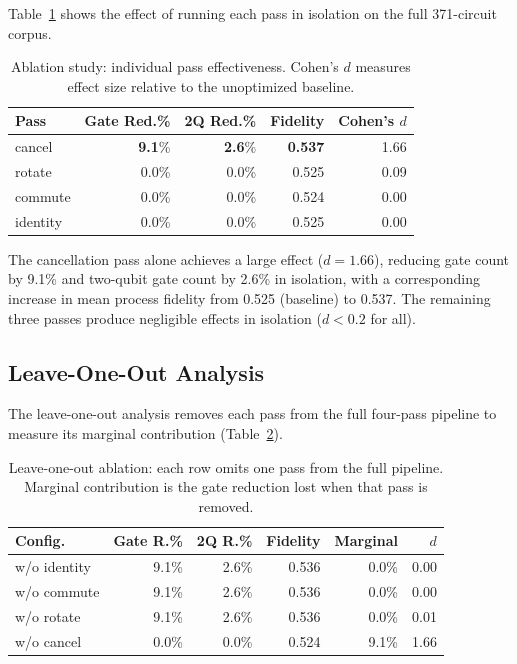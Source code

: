 \documentclass[sigconf,nonacm]{acmart}
\begin{document}
Table~\ref{tab:ablation-ind} shows the effect of running each pass in isolation on the full 371-circuit corpus.

\begin{table}[t]
\centering
\caption{Ablation study: individual pass effectiveness. Cohen's $d$ measures effect size relative to the unoptimized baseline.}
\label{tab:ablation-ind}
\begin{tabular}{lrrrr}
\toprule
\textbf{Pass} & \textbf{Gate Red.\%} & \textbf{2Q Red.\%} & \textbf{Fidelity} & \textbf{Cohen's $d$} \\
\midrule
cancel & \textbf{9.1}\% & \textbf{2.6}\% & \textbf{0.537} & 1.66 \\
rotate & 0.0\% & 0.0\% & 0.525 & 0.09 \\
commute & 0.0\% & 0.0\% & 0.524 & 0.00 \\
identity & 0.0\% & 0.0\% & 0.525 & 0.00 \\
\bottomrule
\end{tabular}
\end{table}

The cancellation pass alone achieves a large effect ($d = 1.66$), reducing gate count by 9.1\% and two-qubit gate count by 2.6\% in isolation, with a corresponding increase in mean process fidelity from 0.525 (baseline) to 0.537. The remaining three passes produce negligible effects in isolation ($d < 0.2$ for all).
\subsection{Leave-One-Out Analysis}

The leave-one-out analysis removes each pass from the full four-pass pipeline to measure its marginal contribution (Table~\ref{tab:ablation-loo}).

\begin{table}[t]
\centering
\caption{Leave-one-out ablation: each row omits one pass from the full pipeline. Marginal contribution is the gate reduction lost when that pass is removed.}
\label{tab:ablation-loo}
\begin{tabular}{lrrrrr}
\toprule
\textbf{Config.} & \textbf{Gate R.\%} & \textbf{2Q R.\%} & \textbf{Fidelity} & \textbf{Marginal} & \textbf{$d$} \\
\midrule
w/o identity & 9.1\% & 2.6\% & 0.536 & 0.0\% & 0.00 \\
w/o commute & 9.1\% & 2.6\% & 0.536 & 0.0\% & 0.00 \\
w/o rotate & 9.1\% & 2.6\% & 0.536 & 0.0\% & 0.01 \\
w/o cancel & 0.0\% & 0.0\% & 0.524 & 9.1\% & 1.66 \\
\bottomrule
\end{tabular}
\end{table}
\end{document}
